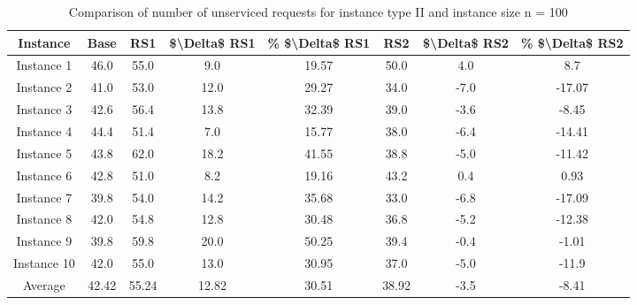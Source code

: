\begin{table}[H]
\centering
\begin{tabular}{cccccccc}
  \hline
  \textbf{Instance} & \textbf{Base} & \textbf{RS1} & \textbf{\$\textbackslash{}Delta\$  RS1} & \textbf{\% \$\textbackslash{}Delta\$  RS1} & \textbf{RS2} & \textbf{\$\textbackslash{}Delta\$  RS2} & \textbf{\% \$\textbackslash{}Delta\$  RS2} \\\hline
  Instance 1 & 46.0 & 55.0 & 9.0 & 19.57 & 50.0 & 4.0 & 8.7 \\
  Instance 2 & 41.0 & 53.0 & 12.0 & 29.27 & 34.0 & -7.0 & -17.07 \\
  Instance 3 & 42.6 & 56.4 & 13.8 & 32.39 & 39.0 & -3.6 & -8.45 \\
  Instance 4 & 44.4 & 51.4 & 7.0 & 15.77 & 38.0 & -6.4 & -14.41 \\
  Instance 5 & 43.8 & 62.0 & 18.2 & 41.55 & 38.8 & -5.0 & -11.42 \\
  Instance 6 & 42.8 & 51.0 & 8.2 & 19.16 & 43.2 & 0.4 & 0.93 \\
  Instance 7 & 39.8 & 54.0 & 14.2 & 35.68 & 33.0 & -6.8 & -17.09 \\
  Instance 8 & 42.0 & 54.8 & 12.8 & 30.48 & 36.8 & -5.2 & -12.38 \\
  Instance 9 & 39.8 & 59.8 & 20.0 & 50.25 & 39.4 & -0.4 & -1.01 \\
  Instance 10 & 42.0 & 55.0 & 13.0 & 30.95 & 37.0 & -5.0 & -11.9 \\
  Average & 42.42 & 55.24 & 12.82 & 30.51 & 38.92 & -3.5 & -8.41 \\\hline
\end{tabular}
\caption{Comparison of number of unserviced requests for instance type II and instance size n = 100}
\label{tab:wait:resrelocation-nTaxi-comparison_II_100}
\end{table}
